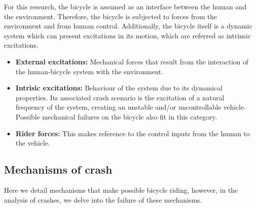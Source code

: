\documentclass{article}
\begin{document}
For this research, the bicycle is assumed as an interface between the human and the environment.
%
Therefore, the bicycle is subjected to forces from the environment and from human control.
%
Additionally, the bicycle itself is a dynamic system which can present excitations in its motion, which are referred as intrinsic excitations.


\begin{itemize}
    \item \textbf{External excitations:} Mechanical forces that result from the interaction of the human-bicycle system with the environment.
    \item \textbf{Intrisic excitations:} Behaviour of the system due to its dynamical properties.
        Its associated crash scenario is the excitation of a natural frequency of the system, creating an unstable and/or uncontrollable vehicle.
        Possible mechanical failures on the bicycle also fit in this category.
    \item \textbf{Rider forces:} This makes reference to the control inputs from the human to the vehicle.
\end{itemize}



\subsection{Mechanisms of crash}

Here we detail mechanisms that make possible bicycle riding, however, in the analysis of crashes, we delve into the failure of these mechanisms.
\end{document}
